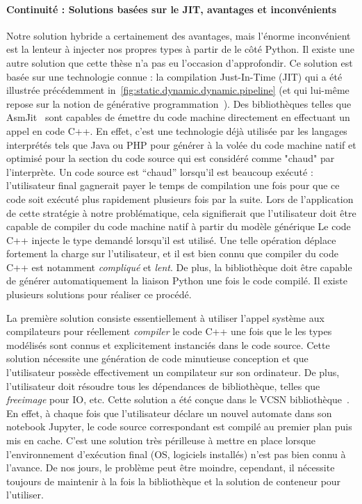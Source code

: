 \paragraph{Continuité : Solutions basées sur le JIT, avantages et inconvénients}

Notre solution hybride a certainement des avantages, mais l'énorme inconvénient est la lenteur à injecter nos propres
types à partir de le côté Python. Il existe une autre solution que cette thèse n'a pas eu l'occasion d'approfondir. Ce
solution est basée sur une technologie connue : la compilation Just-In-Time (JIT) qui a été illustrée précédemment
in~\cref{fig:static.dynamic.dynamic.pipeline} (et qui lui-même repose sur la notion de générative
programmation~\parencite{czarnecki.2000.generative}). Des bibliothèques telles que
AsmJit~\parencite{kobalicek.2011.asmjit} sont capables de émettre du code machine directement en effectuant un appel en
code C++. En effet, c'est une technologie déjà utilisée par les langages interprétés tels que Java ou PHP pour générer à
la volée du code machine natif et optimisé pour la section du code source qui est considéré comme "chaud" par
l'interprète. Un code source est ``chaud'' lorsqu'il est beaucoup exécuté : l'utilisateur final gagnerait payer le temps
de compilation une fois pour que ce code soit exécuté plus rapidement plusieurs fois par la suite. Lors de l'application
de cette stratégie à notre problématique, cela signifierait que l'utilisateur doit être capable de compiler du code
machine natif à partir du modèle générique Le code C++ injecte le type demandé lorsqu'il est utilisé. Une telle
opération déplace fortement la charge sur l'utilisateur, et il est bien connu que compiler du code C++ est notamment
\emph{compliqué} et \emph{lent}. De plus, la bibliothèque doit être capable de générer automatiquement la liaison Python
une fois le code compilé. Il existe plusieurs solutions pour réaliser ce procédé.

La première solution consiste essentiellement à utiliser l'appel système aux compilateurs pour réellement
\emph{compiler} le code C++ une fois que le les types modélisés sont connus et explicitement instanciés dans le code
source. Cette solution nécessite une génération de code minutieuse conception et que l'utilisateur possède effectivement
un compilateur sur son ordinateur. De plus, l'utilisateur doit résoudre tous les dépendances de bibliothèque, telles que
\emph{freeimage} pour IO, etc. Cette solution a été conçue dans le VCSN bibliothèque~\parencite{demaille.2013.vcsn}. En
effet, à chaque fois que l'utilisateur déclare un nouvel automate dans son notebook Jupyter, le code source
correspondant est compilé au premier plan puis mis en cache. C'est une solution très périlleuse à mettre en place
lorsque l'environnement d'exécution final (OS, logiciels installés) n'est pas bien connu à l'avance. De nos jours, le
problème peut être moindre, cependant, il nécessite toujours de maintenir à la fois la bibliothèque et la solution de
conteneur pour l'utiliser.

